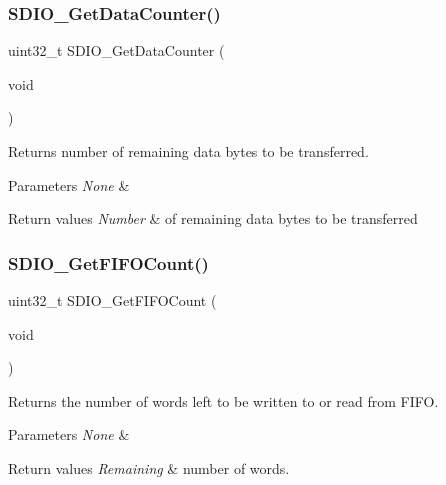 \subsubsection{\texorpdfstring{SDIO\_GetDataCounter()}{SDIO\_GetDataCounter()}}
{\footnotesize\ttfamily uint32\+\_\+t S\+D\+I\+O\+\_\+\+Get\+Data\+Counter (\begin{DoxyParamCaption}\item[{void}]{ }\end{DoxyParamCaption})}



Returns number of remaining data bytes to be transferred. 


\begin{DoxyParams}{Parameters}
{\em None} & \\
\hline
\end{DoxyParams}

\begin{DoxyRetVals}{Return values}
{\em Number} & of remaining data bytes to be transferred \\
\hline
\end{DoxyRetVals}
\mbox{\label{group___s_d_i_o___exported___functions_ga9a3343983a2d68b5164a1c89797d2dd6}} 
\subsubsection{\texorpdfstring{SDIO\_GetFIFOCount()}{SDIO\_GetFIFOCount()}}
{\footnotesize\ttfamily uint32\+\_\+t S\+D\+I\+O\+\_\+\+Get\+F\+I\+F\+O\+Count (\begin{DoxyParamCaption}\item[{void}]{ }\end{DoxyParamCaption})}



Returns the number of words left to be written to or read from F\+I\+FO. 


\begin{DoxyParams}{Parameters}
{\em None} & \\
\hline
\end{DoxyParams}

\begin{DoxyRetVals}{Return values}
{\em Remaining} & number of words. \\
\hline
\end{DoxyRetVals}
\mbox{\label{group___s_d_i_o___exported___functions_ga644514b4b3c95c5c4326d99cd166f6f9}} 
